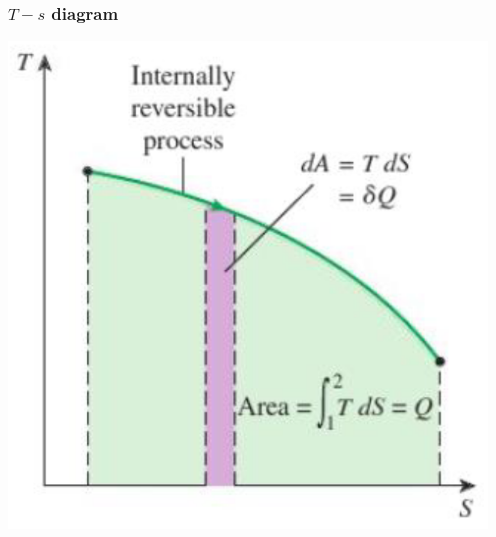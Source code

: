 \documentclass[11pt]{article}
\begin{document}
\subsubsection{\(T-s\) diagram}
\label{sec:orgbae1dcc}
\begin{center}
\includegraphics[scale=0.9]{./images/T-s-diagram.png}
\end{center}
\end{document}
